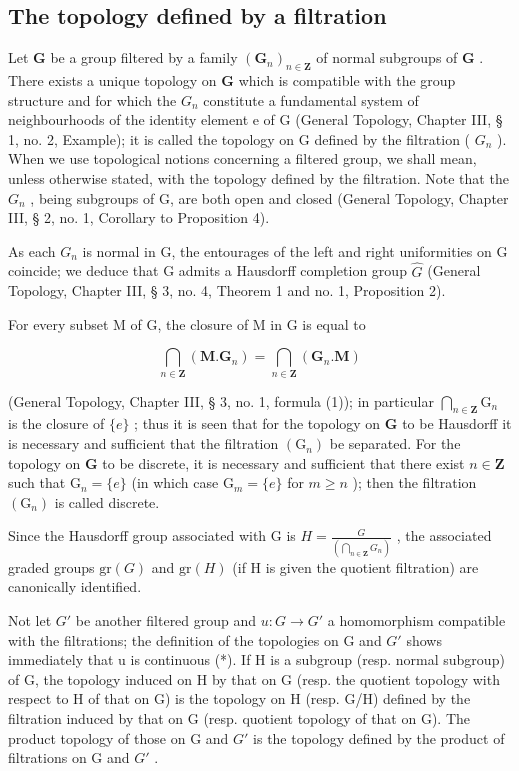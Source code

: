 \subsection{The topology defined by a filtration}

Let \(\mathbf{G}\) be a group filtered by a family \((\mathbf{G}_n)_{n\in \mathbf{Z}}\) of normal subgroups of \(\mathbf{G}\) . There exists a unique topology on \(\mathbf{G}\) which is compatible with the group structure and for which the \(G_{n}\) constitute a fundamental system of neighbourhoods of the identity element e of G (General Topology, Chapter III, § 1, no. 2, Example); it is called the topology on G defined by the filtration ( \(G_{n}\) ). When we use topological notions concerning a filtered group, we shall mean, unless otherwise stated, with the topology defined by the filtration. Note that the \(G_{n}\) , being subgroups of G, are both open and closed (General Topology, Chapter III, § 2, no. 1, Corollary to Proposition 4).

As each \(G_{n}\) is normal in G, the entourages of the left and right uniformities on G coincide; we deduce that G admits a Hausdorff completion group \(\hat{G}\) (General Topology, Chapter III, § 3, no. 4, Theorem 1 and no. 1, Proposition 2).

For every subset M of G, the closure of M in G is equal to

\[
\bigcap_ {n \in \mathbf {Z}} (\mathbf {M}. \mathbf {G} _ {n}) = \bigcap_ {n \in \mathbf {Z}} (\mathbf {G} _ {n}. \mathbf {M})
\]

(General Topology, Chapter III, § 3, no. 1, formula (1)); in particular \(\bigcap_{n\in\mathbf{Z}}\mathrm{G}_{n}\) is the closure of \(\{e\}\) ; thus it is seen that for the topology on \(\mathbf{G}\) to be Hausdorff it is necessary and sufficient that the filtration \((\mathrm{G}_{n})\) be separated. For the topology on \(\mathbf{G}\) to be discrete, it is necessary and sufficient that there exist \(n\in\mathbf{Z}\) such that \(\mathrm{G}_{n}=\{e\}\) (in which case \(\mathrm{G}_{m}=\{e\}\) for \(m\geqslant n\) ); then the filtration \((\mathrm{G}_{n})\) is called discrete.

Since the Hausdorff group associated with G is \(H = \frac{G}{\left(\bigcap_{n \in \mathbf{Z}} G_n\right)}\) , the associated graded groups \(\text{gr}(G)\) and \(\text{gr}(H)\) (if H is given the quotient filtration) are canonically identified.

Not let \(G'\) be another filtered group and \(u: G \to G'\) a homomorphism compatible with the filtrations; the definition of the topologies on G and \(G'\) shows immediately that u is continuous (*). If H is a subgroup (resp. normal subgroup) of G, the topology induced on H by that on G (resp. the quotient topology with respect to H of that on G) is the topology on H (resp. G/H) defined by the filtration induced by that on G (resp. quotient topology of that on G). The product topology of those on G and \(G'\) is the topology defined by the product of filtrations on G and \(G'\) .


